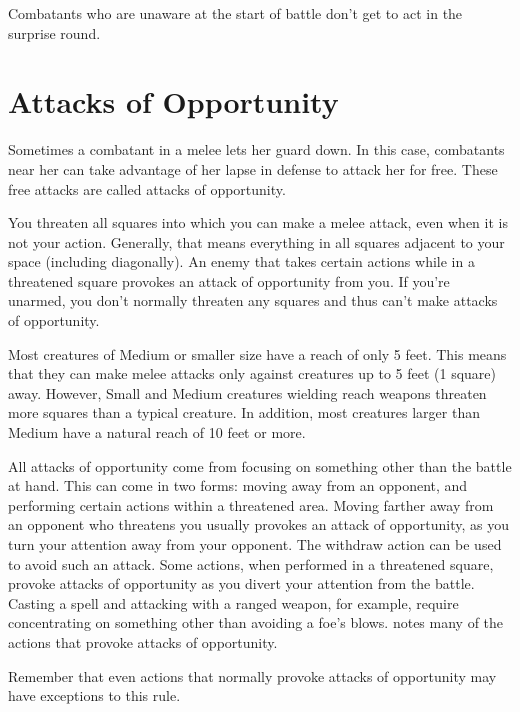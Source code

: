  Combatants who are unaware at the start of battle don't get to act in the surprise round.

\section{Attacks of Opportunity}
Sometimes a combatant in a melee lets her guard down. In this case, combatants near her can take advantage of her lapse in defense to attack her for free. These free attacks are called attacks of opportunity.

 You threaten all squares into which you can make a melee attack, even when it is not your action. Generally, that means everything in all squares adjacent to your space (including diagonally). An enemy that takes certain actions while in a threatened square provokes an attack of opportunity from you. If you're unarmed, you don't normally threaten any squares and thus can't make attacks of opportunity.

 Most creatures of Medium or smaller size have a reach of only 5 feet. This means that they can make melee attacks only against creatures up to 5 feet (1 square) away. However, Small and Medium creatures wielding reach weapons threaten more squares than a typical creature. In addition, most creatures larger than Medium have a natural reach of 10 feet or more.

 All attacks of opportunity come from focusing on something other than the battle at hand. This can come in two forms: moving away from an opponent, and performing certain actions within a threatened area.
 Moving farther away from an opponent who threatens you usually provokes an attack of opportunity, as you turn your attention away from your opponent. The withdraw action can be used to avoid such an attack.
 Some actions, when performed in a
threatened square, provoke attacks of opportunity as you divert your
attention from the battle. Casting a spell and attacking with a ranged
weapon, for example, require concentrating on something other than avoiding a foe's blows.  notes many of the actions that provoke attacks of opportunity.

\par Remember that even actions that normally provoke attacks of opportunity may have exceptions to this rule.

